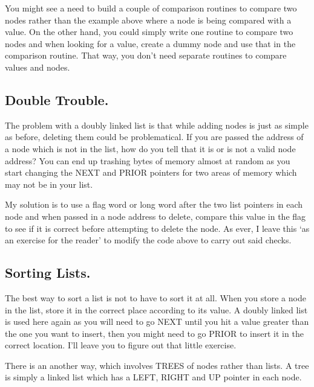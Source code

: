 You might see a need to build a couple of comparison routines to
      compare two nodes rather than the example above where a node is being
      compared with a value. On the other hand, you could simply write one
      routine to compare two nodes and when looking for a value, create a
      dummy node and use that in the comparison routine. That way, you don't
      need separate routines to compare values and nodes.

\subsection{Double Trouble.}
\label{ch10-double-trouble}%

The problem with a doubly linked list is that while adding nodes
      is just as simple as before, deleting them could be problematical.
      If you are passed the address of a node which is not in the list, how do
      you tell that it is or is not a valid node address? You can end up
      trashing bytes of memory almost at random as you start changing the NEXT
      and PRIOR pointers for two areas of memory which may not be in your
      list.

My solution is to use a flag word or long word after the two list
      pointers in each node and when passed in a node address to delete,
      compare this value in the flag to see if it is correct before attempting
      to delete the node. As ever, I leave this `as an exercise for the
      reader' to modify the code above to carry out said checks.

\subsection{Sorting Lists.}
\label{ch10-sorting-lists}%

The best way to sort a list is not to have to sort it at all. When
      you store a node in the list, store it in the correct place according to
      its value. A doubly linked list is used here again as you will need to
      go NEXT until you hit a value greater than the one you want to insert,
      then you might need to go PRIOR to insert it in the correct location.
      I'll leave you to figure out that little exercise.

There is an another way, which involves TREES of nodes rather than
      lists. A tree is simply a linked list which has a LEFT, RIGHT and UP
      pointer in each node.

